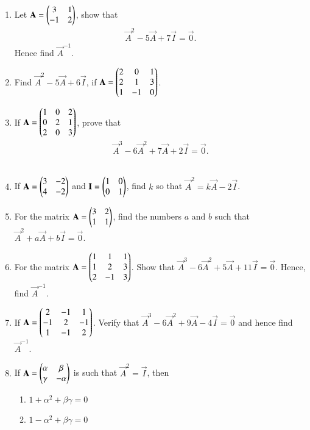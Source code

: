 \begin{enumerate}[label=\thesubsection.\arabic*,ref=\thesubsection.\theenumi]
\item Let $\mathbf{A}=\begin{pmatrix}3 & 1 \\ -1 & 2\end{pmatrix}$, show that 
\begin{align}
	\label{eq:caylel-1}
		\vec{A}^2-5\vec{A}+7\vec{I}=\vec{0}.
\end{align}
 Hence find $\vec{A}^{-1}$.
 \\
\solution
%

\item Find $\vec{A}^2-5\vec{A}+6\vec{I}$, if $\mathbf{A}=\begin{pmatrix}
2 & 0 & 1 \\ 2 & 1 & 3 \\ 1 & -1 & 0\end{pmatrix}$.
\item If $\mathbf{A}=\begin{pmatrix}1 & 0 & 2 \\ 0 & 2 & 1 \\ 2 & 0 & 3\end{pmatrix}$, prove that 
\begin{align}
		\vec{A}^3-6\vec{A}^2+7\vec{A}+2\vec{I}=\vec{0}.
\label{eq:chareq1}
\end{align}
\\
\solution

\item If $\mathbf{A}=\begin{pmatrix}3 & -2 \\ 4 & -2\end{pmatrix}$ and $\mathbf{I}=\begin{pmatrix}1 & 0 \\ 0 & 1\end{pmatrix}$, find $k$ so that $\vec{A}^2=k\vec{A}-2\vec{I}$.
\item For the matrix $\mathbf{A}=\begin{pmatrix}3 & 2 \\ 1 & 1\end{pmatrix}$, find the numbers $a$ and $b$ such that $\vec{A}^2+a\vec{A}+b\vec{I}=\vec{0}$.
\item For the matrix $\mathbf{A}=\begin{pmatrix}1 & 1 & 1 \\ 1 & 2 & 3 \\ 2 & -1 & 3\end{pmatrix}$. Show that $\vec{A}^3-6\vec{A}^2+5\vec{A}+11\vec{I}=\vec{0}$. Hence, find $\vec{A}^{-1}$.
\item If $\mathbf{A}=\begin{pmatrix}2 & -1 & 1 \\ -1 & 2 & -1 \\ 1 & -1 & 2\end{pmatrix}$. Verify that $\vec{A}^3-6\vec{A}^2+9\vec{A}-4\vec{I}=\vec{0}$ and hence find $\vec{A}^{-1}$.
\item If $\mathbf{A}=\begin{pmatrix}\alpha& \beta \\ \gamma& -\alpha\end{pmatrix}$ is such that $\vec{A}^2= \vec{I}$, then
\begin{enumerate} 
\item $1+ \alpha^2+ \beta \gamma=0$
\item $1-\alpha^2+ \beta \gamma=0$

\end{enumerate}
\end{enumerate}
